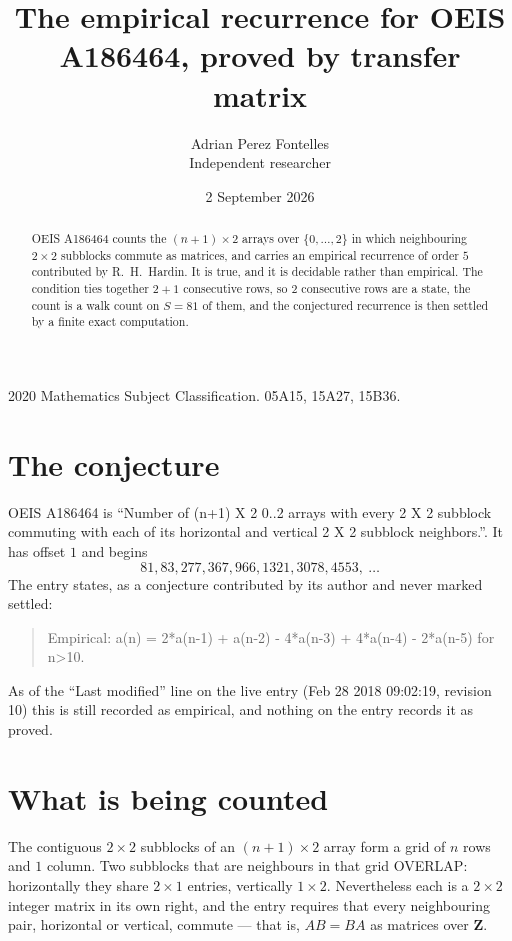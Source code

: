 \documentclass[11pt,a4paper]{article}
\title{The empirical recurrence for OEIS A186464, proved by transfer matrix}
\author{Adrian Perez Fontelles\\ \small Independent researcher}
\date{2 September 2026}
\theoremstyle{plain}
\theoremstyle{definition}
\begin{document}
\maketitle

\begin{abstract}
OEIS A186464 counts the $(n+1)\times2$ arrays over $\{0,\dots,2\}$ in which
neighbouring $2\times2$ subblocks commute as matrices, and carries an empirical recurrence
of order $5$ contributed by R.~H.~Hardin. It is true, and it is decidable rather than
empirical. The condition ties together $2+1$ consecutive rows, so $2$ consecutive rows are
a state, the count is a walk count on $S=81$ of them, and the conjectured recurrence is then
settled by a finite exact computation.
\end{abstract}

\noindent\small 2020 Mathematics Subject Classification. 05A15, 15A27, 15B36.\normalsize

\section{The conjecture}

OEIS A186464 is ``Number of (n+1) X 2 0..2 arrays with every 2 X 2 subblock commuting with each of its horizontal and vertical 2 X 2 subblock neighbors.''. It has offset $1$ and begins
\[
81, 83, 277, 367, 966, 1321, 3078, 4553,\ \dots
\]
The entry states, as a conjecture contributed by its author and never marked settled:
\begin{quote}
Empirical: a(n) = 2*a(n-1) + a(n-2) - 4*a(n-3) + 4*a(n-4) - 2*a(n-5) for n>10.
\end{quote}
As of the ``Last modified'' line on the live entry (Feb 28 2018 09:02:19, revision 10) this is still
recorded as empirical, and nothing on the entry records it as proved.

\section{What is being counted}

The contiguous $2\times2$ subblocks of an $(n+1)\times2$ array form a grid of $n$
rows and $1$ column. Two subblocks that are neighbours in that
grid OVERLAP: horizontally they share $2\times1$ entries, vertically
$1\times2$. Nevertheless each is a $2\times2$ integer matrix in its own right, and
the entry requires that every neighbouring pair, horizontal or vertical, commute --- that is,
$AB=BA$ as matrices over $\mathbf{Z}$.
\end{document}
